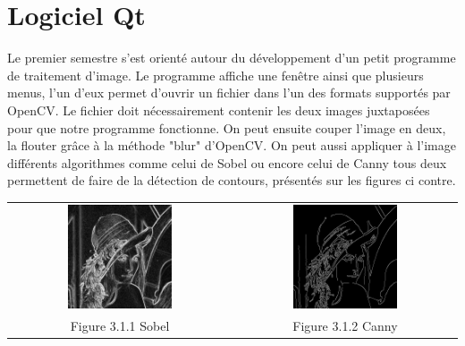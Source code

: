 \documentclass[12pt,a4paper]{report}
\begin{document}
\section{Logiciel Qt}
Le premier semestre s'est orienté autour du développement d'un petit programme de traitement d'image. Le programme affiche une fenêtre ainsi que plusieurs menus, l'un d'eux permet d'ouvrir un fichier dans l'un des formats supportés par OpenCV.
Le fichier doit nécessairement contenir les deux images juxtaposées pour que notre programme fonctionne. On peut ensuite couper l'image en deux, la flouter grâce à la méthode "blur" d'OpenCV. On peut aussi appliquer à l'image différents algorithmes comme celui de Sobel ou encore celui de Canny tous deux permettent de faire de la détection de contours, présentés sur les figures ci contre.
\begin{center}
\begin{tabular}{cc}
  \vspace{0pt} \includegraphics[width=0.49\textwidth]{sobel.jpg} &
  \vspace{0pt} \includegraphics[width=0.49\textwidth]{canny.jpg} \\
    
  Figure 3.1.1 Sobel & Figure 3.1.2 Canny
\end{tabular}
\end{center}
\end{document}
